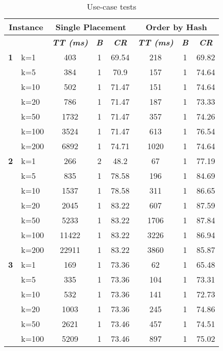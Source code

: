     \begin{table}[htbp]
    \caption{Use-case tests}
    \centering
    \begin{tabular}{|l|l|c|c|c|c|c|c|}
    
    \multicolumn{ 2}{|c|}{\textbf{Instance}} & \multicolumn{ 3}{c|}{\textbf{Single Placement}} & \multicolumn{ 3}{c|}{\textbf{Order by Hash}} \\ \hline
    \multicolumn{ 2}{|l|}{} & \textbf{\textit{TT (ms)}} & \textbf{\textit{B}} & \textbf{\textit{CR}} & \textbf{\textit{TT (ms)}} & \textbf{\textit{B}} & \textbf{\textit{CR}} \\ \hline
    \multicolumn{1}{|r|}{\textbf{1}} & k=1 & 403 & 1 & 69.54 & 218 & 1 & 69.82 \\ 
     & k=5 & 384 & 1 & 70.9 & 157 & 1 & 74.64 \\ 
     & k=10 & 502 & 1 & 71.47 & 151 & 1 & 74.64 \\ 
     & k=20 & 786 & 1 & 71.47 & 187 & 1 & 73.33 \\ 
     & k=50 & 1732 & 1 & 71.47 & 357 & 1 & 74.26 \\ 
     & k=100 & 3524 & 1 & 71.47 & 613 & 1 & 76.54 \\ 
     & k=200 & 6892 & 1 & 74.71 & 1020 & 1 & 74.64 \\ \hline
    \multicolumn{1}{|r|}{\textbf{2}} & k=1 & 266 & 2 & 48.2 & 67 & 1 & 77.19 \\ 
     & k=5 & 835 & 1 & 78.58 & 196 & 1 & 84.69 \\ 
     & k=10 & 1537 & 1 & 78.58 & 311 & 1 & 86.65 \\ 
     & k=20 & 2045 & 1 & 83.22 & 607 & 1 & 87.59 \\ 
     & k=50 & 5233 & 1 & 83.22 & 1706 & 1 & 87.84 \\ 
     & k=100 & 11422 & 1 & 83.22 & 3226 & 1 & 86.94 \\ 
     & k=200 & 22911 & 1 & 83.22 & 3860 & 1 & 85.87 \\ \hline
    \multicolumn{1}{|r|}{\textbf{3}} & k=1 & 169 & 1 & 73.36 & 62 & 1 & 65.48 \\ 
     & k=5 & 335 & 1 & 73.36 & 104 & 1 & 73.31 \\ 
     & k=10 & 532 & 1 & 73.36 & 141 & 1 & 72.73 \\ 
     & k=20 & 1003 & 1 & 73.36 & 245 & 1 & 74.86 \\ 
     & k=50 & 2621 & 1 & 73.46 & 457 & 1 & 74.51 \\ 
     & k=100 & 5209 & 1 & 73.46 & 897 & 1 & 75.02 \\ 

\end{tabular}
\end{table}
